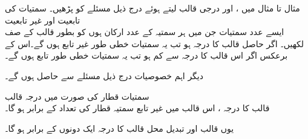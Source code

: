 مثال  تا مثال  میں ،  اور درجی قالب  لیتے ہوئے  درج ذیل مسئلے  کو پڑھیں۔ 
\quad سمتیات کی  تابعیت اور غیر تابعیت\\
ایسے  عدد سمتیات جن میں ہر سمتیہ کے  عدد ارکان ہوں کو بطور قالب کے صف لکھیں۔ اگر حاصل قالب کا درجہ  ہو تب یہ سمتیات خطی طور غیر تابع ہوں گے۔اس کے برعکس اگر اس قالب کا درجہ  سے کم ہو تب یہ سمتیات خطی طور تابع ہوں گے۔

دیگر اہم خصوصیات درج ذیل مسئلے سے حاصل ہوں گے۔

\quad سمتیات قطار کی صورت میں درجہ قالب\\
قالب  کا درجہ ، اس قالب میں غیر تابع سمتیہ قطار کی تعداد کے برابر ہو گا۔

یوں قالب  اور تبدیل محل قالب  کا درجہ ایک دونوں کے  برابر ہو گا۔ 


